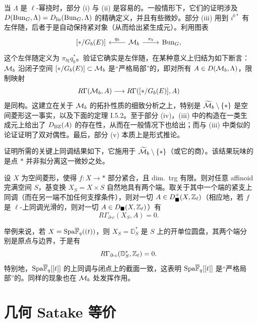当 $\Lambda$ 是 $\ell$-幂挠时，部分 (i) 与 (ii) 是容易的。一般情形下，它们的证明涉及 $D(\mathrm{Bun}_G,\Lambda)=D_{\mathrm{lis}}(\mathrm{Bun}_G,\Lambda)$ 的精确定义，并且有些微妙。部分 (iii) 用到 $i^{b*}$ 有左伴随，后者于是自动保持紧对象（从而给出紧生成元）。利用图表
\[
\begin{tikzcd}
{[*/G_b(E)]} & \cM_b \arrow[l,"q_b"'] \arrow[r,"\pi_b"] & \Bun_G,
\end{tikzcd}
\]
这个左伴随定义为 $\pi_{b\natural}q_b^*$。验证它确实是左伴随，在某种意义上归结为如下断言：$\mathcal{M}_b$ 沿闭子空间 $[*/G_b(E)]\subset\mathcal{M}_b$ 是“严格局部”的，即对所有 $A\in D(\mathcal{M}_b,\Lambda)$，限制映射
\[
R\Gamma(\mathcal{M}_b,A)\longrightarrow R\Gamma([*/G_b(E)],A)
\]
是同构。这建立在关于 $\mathcal{M}_b$ 的拓扑性质的细致分析之上，特别是 $\widetilde{\mathcal{M}}_b\setminus\{*\}$ 是空间菱形这一事实，以及下面的定理 I.5.2。至于部分 (iv)，(iii) 中的构造在一类生成元上给出了 $D_{\mathrm{BZ}}(A)$ 的存在性，从而在一般情况下也给出；而与 (iii) 中类似的论证证明了双对偶性。最后，部分 (v) 本质上是形式推论。



证明所需的关键上同调结果如下，它施用于 $\widetilde{\mathcal{M}}_b\setminus\{*\}$（或它的商）。该结果玩味的是点 $*$ 并非拟分离这一微妙之处。

\begin{theorem}%
设 $X$ 为空间菱形，使得 $f:X\to *$ 部分紧合，且 dim.\ trg 有限。则对任意 affinoid 完满空间 $S$，基变换 $X_S=X\times S$ 自然地具有两个端。取关于其中一个端的紧支上同调（而在另一端不加任何支撑条件），则对一切 $A\in D^+_{\blacksquare}(X,\mathbb{Z}_\ell)$（相应地，若 $f$ 是 $\ell$-上同调光滑的，则对一切 $A\in D_{\blacksquare}(X,\mathbb{Z}_\ell)$）有
\[
R\Gamma_{\partial\text{-}c}(X_S,A)=0.
\]
\end{theorem}

举例来说，若 $X=\mathrm{Spa}\overline{\mathbb{F}}_q((t))$，则 $X_S=\mathbb{D}^*_S$ 是 $S$ 上的开单位圆盘，其两个端分别是原点与边界，于是有
\[
R\Gamma_{\partial\text{-}c}(\mathbb{D}^*_S,\mathbb{Z}_\ell)=0.
\]
特别地，$\mathrm{Spa}\overline{\mathbb{F}}_q[[t]]$ 的上同调与闭点上的截面一致，这表明 $\mathrm{Spa}\overline{\mathbb{F}}_q[[t]]$ 是“严格局部”的。同样的现象也在 $\mathcal{M}_b$ 处发挥作用。

\section{几何 Satake 等价}

